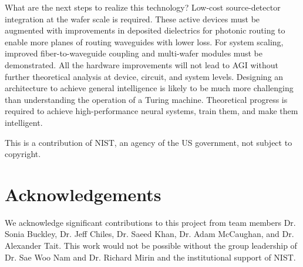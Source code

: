 \documentclass[twocolumn]{article}
\begin{document}
What are the next steps to realize this technology? Low-cost source-detector integration at the wafer scale is required. These active devices must be augmented with improvements in deposited dielectrics for photonic routing to enable more planes of routing waveguides with lower loss. For system scaling, improved fiber-to-waveguide coupling and multi-wafer modules must be demonstrated. All the hardware improvements will not lead to AGI without further theoretical analysis at device, circuit, and system levels. Designing an architecture to achieve general intelligence is likely to be much more challenging than understanding the operation of a Turing machine. Theoretical progress is required to achieve high-performance neural systems, train them, and make them intelligent.

\vspace{2em}
This is a contribution of NIST, an agency of the US government, not subject to copyright.

\section{\label{sec:acknowledgements}Acknowledgements}
We acknowledge significant contributions to this project from team members Dr. Sonia Buckley, Dr. Jeff Chiles, Dr. Saeed Khan, Dr. Adam McCaughan, and Dr. Alexander Tait. This work would not be possible without the group leadership of Dr. Sae Woo Nam and Dr. Richard Mirin and the institutional support of NIST.



\end{document}

